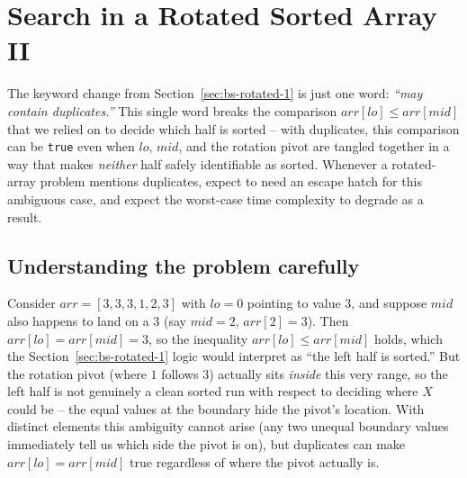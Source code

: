 \section{Search in a Rotated Sorted Array II}
\label{sec:bs-rotated-2}


\begin{patternbox}
The keyword change from Section~\ref{sec:bs-rotated-1} is just one word:
\emph{``may contain duplicates.''} This single word breaks the comparison
$\textit{arr}[\textit{lo}] \le \textit{arr}[\textit{mid}]$ that we relied on
to decide which half is sorted -- with duplicates, this comparison can be
\texttt{true} even when $\textit{lo}$, $\textit{mid}$, and the rotation
pivot are tangled together in a way that makes \emph{neither} half safely
identifiable as sorted. Whenever a rotated-array problem mentions
duplicates, expect to need an escape hatch for this ambiguous case, and
expect the worst-case time complexity to degrade as a result.
\end{patternbox}

\subsection*{Understanding the problem carefully}

Consider $\textit{arr} = [3,3,3,1,2,3]$ with $\textit{lo}=0$ pointing to
value $3$, and suppose $\textit{mid}$ also happens to land on a $3$ (say
$\textit{mid}=2$, $\textit{arr}[2]=3$). Then
$\textit{arr}[\textit{lo}] = \textit{arr}[\textit{mid}] = 3$, so the
inequality $\textit{arr}[\textit{lo}] \le \textit{arr}[\textit{mid}]$ holds,
which the Section~\ref{sec:bs-rotated-1} logic would interpret as ``the
left half is sorted.'' But the rotation pivot (where $1$ follows $3$)
actually sits \emph{inside} this very range, so the left half is not
genuinely a clean sorted run with respect to deciding where $X$ could be --
the equal values at the boundary hide the pivot's location. With distinct
elements this ambiguity cannot arise (any two unequal boundary values
immediately tell us which side the pivot is on), but duplicates can make
$\textit{arr}[\textit{lo}] = \textit{arr}[\textit{mid}]$ true regardless of
where the pivot actually is.


